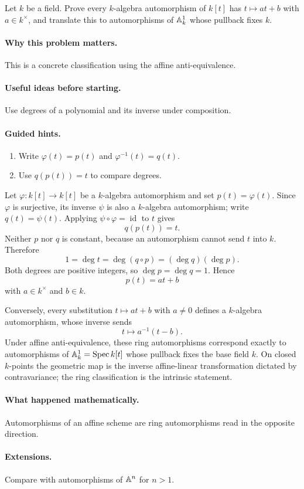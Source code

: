 \begin{problem}\label{prob:vi19-p12}
Let $k$ be a field. Prove every $k$-algebra automorphism of $k[t]$ has $t\mapsto at+b$ with $a\in k^\times$, and translate this to automorphisms of $\mathbb A^1_k$ whose pullback fixes $k$.
\end{problem}

\ifdefined\FullProblemDossiers
\paragraph{Why this problem matters.}
This is a concrete classification using the affine anti-equivalence.

\paragraph{Useful ideas before starting.}
Use degrees of a polynomial and its inverse under composition.

\paragraph{Guided hints.}
\begin{enumerate}
\item Write $\varphi(t)=p(t)$ and $\varphi^{-1}(t)=q(t)$.
\item Use $q(p(t))=t$ to compare degrees.
\end{enumerate}

\begin{solution}
Let \(\varphi:k[t]\to k[t]\) be a \(k\)-algebra automorphism and set \(p(t)=\varphi(t)\).  Since \(\varphi\) is surjective, its inverse \(\psi\) is also a \(k\)-algebra automorphism; write \(q(t)=\psi(t)\).  Applying \(\psi\circ\varphi=\operatorname{id}\) to \(t\) gives
\[
q(p(t))=t.
\]
Neither \(p\) nor \(q\) is constant, because an automorphism cannot send \(t\) into \(k\).  Therefore
\[
1=\deg t=\deg(q\circ p)=(\deg q)(\deg p).
\]
Both degrees are positive integers, so \(\deg p=\deg q=1\).  Hence
\[
p(t)=at+b
\]
with \(a\in k^\times\) and \(b\in k\).

Conversely, every substitution \(t\mapsto at+b\) with \(a\neq0\) defines a \(k\)-algebra automorphism, whose inverse sends
\[
t\longmapsto a^{-1}(t-b).
\]
Under affine anti-equivalence, these ring automorphisms correspond exactly to automorphisms of \(\mathbb A_k^1=\operatorname{Spec} k[t]\) whose pullback fixes the base field \(k\).  On closed \(k\)-points the geometric map is the inverse affine-linear transformation dictated by contravariance; the ring classification is the intrinsic statement.
\end{solution}

\paragraph{What happened mathematically.}
Automorphisms of an affine scheme are ring automorphisms read in the opposite direction.

\paragraph{Extensions.}
Compare with automorphisms of $\mathbb A^n$ for $n>1$.
\fi
